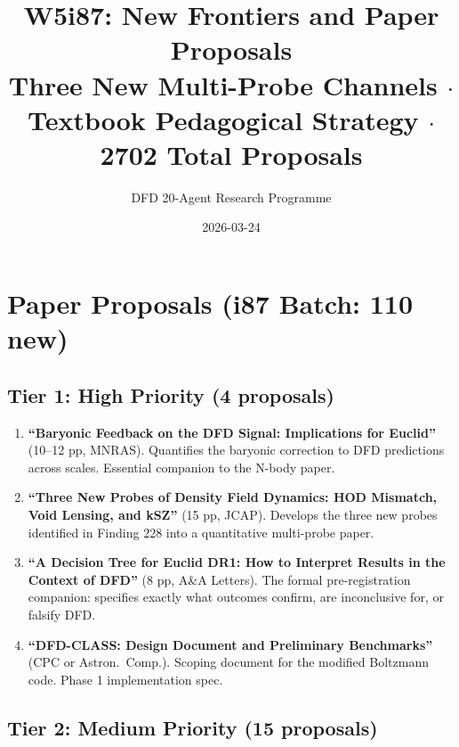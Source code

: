 \documentclass[11pt,a4paper]{article}
\title{W5i87: New Frontiers and Paper Proposals\\[6pt]
\large Three New Multi-Probe Channels $\cdot$ Textbook Pedagogical Strategy $\cdot$ 2702 Total Proposals}
\author{DFD 20-Agent Research Programme}
\date{2026-03-24}
\begin{document}
\maketitle

\section{Paper Proposals (i87 Batch: 110 new)}

\subsection{Tier 1: High Priority (4 proposals)}

\begin{enumerate}[nosep]
\item \textbf{``Baryonic Feedback on the DFD Signal: Implications for Euclid''} (10--12 pp, MNRAS). Quantifies the baryonic correction to DFD predictions across scales. Essential companion to the N-body paper.

\item \textbf{``Three New Probes of Density Field Dynamics: HOD Mismatch, Void Lensing, and kSZ''} (15 pp, JCAP). Develops the three new probes identified in Finding 228 into a quantitative multi-probe paper.

\item \textbf{``A Decision Tree for Euclid DR1: How to Interpret Results in the Context of DFD''} (8 pp, A\&A Letters). The formal pre-registration companion: specifies exactly what outcomes confirm, are inconclusive for, or falsify DFD.

\item \textbf{``DFD-CLASS: Design Document and Preliminary Benchmarks''} (CPC or Astron.\ Comp.). Scoping document for the modified Boltzmann code. Phase 1 implementation spec.
\end{enumerate}

\subsection{Tier 2: Medium Priority (15 proposals)}
\end{document}
